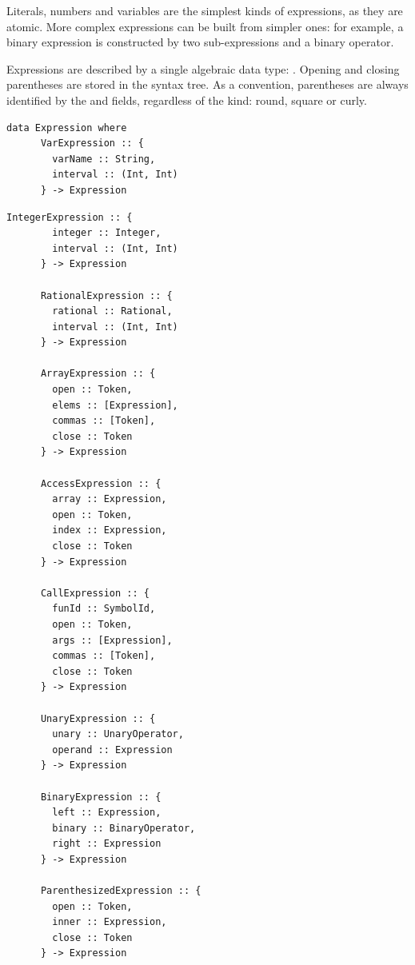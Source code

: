 \documentclass[UdineBachThesis,american,11pt]{PhdThesis}
\begin{document}
  Literals, numbers and variables are the simplest kinds of expressions, as they
  are atomic. More complex expressions can be built from simpler ones: for
  example, a binary expression is constructed by two sub-expressions and a
  binary operator.

  Expressions are described by a single algebraic data type:
  \lstinline@Expression@. Opening and closing parentheses are stored in the
  syntax tree. As a convention, parentheses are always identified by the
  \lstinline@open@ and \lstinline@close@ fields, regardless of the kind:
  round, square or curly.

  \begin{lstlisting}[gobble=4,basicstyle=\ttfamily\small]
    data Expression where
      VarExpression :: {
        varName :: String,
        interval :: (Int, Int)
      } -> Expression
  \end{lstlisting}

  \newpage

  \begin{lstlisting}[gobble=4,basicstyle=\ttfamily\small]
      IntegerExpression :: {
        integer :: Integer,
        interval :: (Int, Int)
      } -> Expression

      RationalExpression :: {
        rational :: Rational,
        interval :: (Int, Int)
      } -> Expression

      ArrayExpression :: {
        open :: Token,
        elems :: [Expression],
        commas :: [Token],
        close :: Token
      } -> Expression

      AccessExpression :: {
        array :: Expression,
        open :: Token,
        index :: Expression,
        close :: Token
      } -> Expression

      CallExpression :: {
        funId :: SymbolId,
        open :: Token,
        args :: [Expression],
        commas :: [Token],
        close :: Token
      } -> Expression

      UnaryExpression :: {
        unary :: UnaryOperator,
        operand :: Expression
      } -> Expression

      BinaryExpression :: {
        left :: Expression,
        binary :: BinaryOperator,
        right :: Expression
      } -> Expression

      ParenthesizedExpression :: {
        open :: Token,
        inner :: Expression,
        close :: Token
      } -> Expression
  \end{lstlisting}

  \newpage
\end{document}

